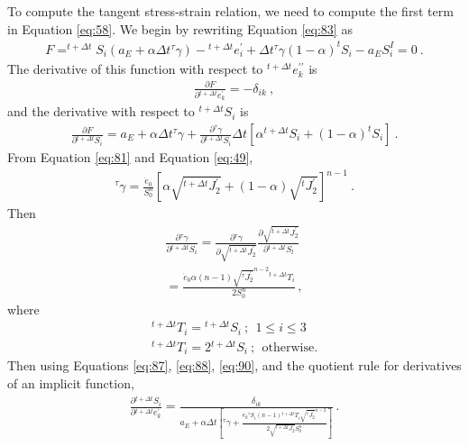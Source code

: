 To compute the tangent stress-strain relation, we need to compute
the first term in Equation \vref{eq:58}. We begin by rewriting Equation
\vref{eq:83} as
\begin{gather}
F=^{t+\Delta t}S_{i}\left(a_{E}+\alpha\Delta t\phantom{}^{\tau}\gamma\right)-\phantom{}^{t+\Delta t}e_{i}^{\prime}+\Delta t\phantom{}^{\tau}\gamma\left(1-\alpha\right)^{t}S_{i}-a_{E}S_{i}^{I}=0\:.\label{eq:86}
\end{gather}
The derivative of this function with respect to $^{t+\Delta t}e_{k}^{\prime\prime}$
is
\begin{gather}
\frac{\partial F}{\partial\phantom{}^{t+\Delta t}e_{k}^{\prime}}=-\delta_{ik}\:,\label{eq:87}
\end{gather}
and the derivative with respect to $^{t+\Delta t}S_{i}$ is
\begin{gather}
\frac{\partial F}{\partial\phantom{}^{t+\Delta t}S_{i}}=a_{E}+\alpha\Delta t\phantom{}^{\tau}\gamma+\frac{\partial\phantom{}^{\tau}\gamma}{\partial\phantom{}^{t+\Delta t}S_{i}}\Delta t\left[\alpha\phantom{}^{t+\Delta t}S_{i}+\left(1-\alpha\right)^{t}S_{i}\right]\:.\label{eq:88}
\end{gather}
From Equation \vref{eq:81} and Equation \vref{eq:49},
\begin{gather}
^{\tau}\gamma=\frac{\dot{e}_{0}}{S_{0}^{n}}\left[\alpha\sqrt{^{t+\Delta t}J_{2}^{\prime}}+\left(1-\alpha\right)\sqrt{^{t}J_{2}^{\prime}}\right]^{n-1}\:.\label{eq:89}
\end{gather}
Then
\begin{gather}
\frac{\partial\phantom{}^{\tau}\gamma}{\partial{}^{t+\Delta t}S_{i}}=\frac{\partial\phantom{}^{\tau}\gamma}{\partial\sqrt{^{t+\Delta t}J_{2}^{\prime}}}\frac{\partial\sqrt{^{t+\Delta t}J_{2}^{\prime}}}{\partial\phantom{}^{t+\Delta t}S_{l}}\label{eq:90}\\
=\frac{\dot{e}_{0}\alpha\left(n-1\right)\sqrt{^{\tau}J_{2}^{\prime}}^{n-2}{}^{t+\Delta t}T_{i}}{2S_{0}^{n}}\,,\nonumber 
\end{gather}
where
\begin{gather}
^{t+\Delta t}T_{i}=\phantom{}^{t+\Delta t}S_{i}\:;\:\:1\leq i\leq3\label{eq:91}\\
^{t+\Delta t}T_{i}=2\phantom{}^{t+\Delta t}S_{i}\:;\:\:\textrm{otherwise.}\nonumber 
\end{gather}
Then using Equations \vref{eq:87}, \vref{eq:88}, \vref{eq:90}, and
the quotient rule for derivatives of an implicit function,
\begin{gather}
\frac{\partial\phantom{}^{t+\Delta t}S_{i}}{\partial{}^{t+\Delta t}e_{k}^{\prime}}=\frac{\delta_{ik}}{a_{E}+\alpha\Delta t\left[^{\tau}\gamma+\frac{\dot{e}_{0}{}^{\tau}S_{i}\left(n-1\right){}^{t+\Delta t}T_{i}\sqrt{^{\tau}J_{2}^{\prime}}^{n-2}}{2\sqrt{^{t+\Delta t}J_{2}^{\prime}}S_{0}^{n}}\right]}\,.\label{eq:92}
\end{gather}
